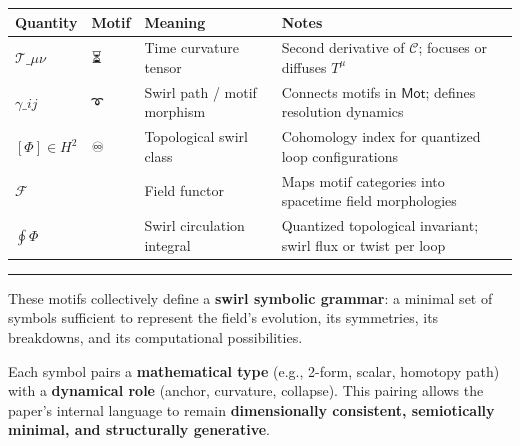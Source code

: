 \documentclass[
  11pt,
]{article}
\begin{document}
\begin{longtable}[]{@{}
  >{\raggedright\arraybackslash}p{}
  >{\raggedright\arraybackslash}p{}
  >{\raggedright\arraybackslash}p{}
  >{\raggedright\arraybackslash}p{}@{}}
\toprule\noalign{}
\begin{minipage}[b]{\linewidth}\raggedright
Quantity
\end{minipage} & \begin{minipage}[b]{\linewidth}\raggedright
Motif
\end{minipage} & \begin{minipage}[b]{\linewidth}\raggedright
Meaning
\end{minipage} & \begin{minipage}[b]{\linewidth}\raggedright
Notes
\end{minipage} \\
\midrule\noalign{}
\endhead
\bottomrule\noalign{}
\endlastfoot
\(\mathcal{T}\_{\mu\nu}\) & ⏳ & Time curvature tensor & Second
derivative of \(\mathcal{C}\); focuses or diffuses \(T^\mu\) \\
\(\gamma\_{ij}\) & ➰ & Swirl path / motif morphism & Connects motifs in
\(\mathsf{Mot}\); defines resolution dynamics \\
\([\Phi] \in H^2\) & ♾️ & Topological swirl class & Cohomology index for
quantized loop configurations \\
\(\mathcal{F}\) & 📎 & Field functor & Maps motif categories into
spacetime field morphologies \\
\(\oint \Phi\) & 🔁 & Swirl circulation integral & Quantized topological
invariant; swirl flux or twist per loop \\
\end{longtable}

\begin{center}\rule{0.5\linewidth}{0.5pt}\end{center}

These motifs collectively define a \textbf{swirl symbolic grammar}: a
minimal set of symbols sufficient to represent the field's evolution,
its symmetries, its breakdowns, and its computational possibilities.

Each symbol pairs a \textbf{mathematical type} (e.g., 2-form, scalar,
homotopy path) with a \textbf{dynamical role} (anchor, curvature,
collapse). This pairing allows the paper's internal language to remain
\textbf{dimensionally consistent, semiotically minimal, and structurally
generative}.
\end{document}
